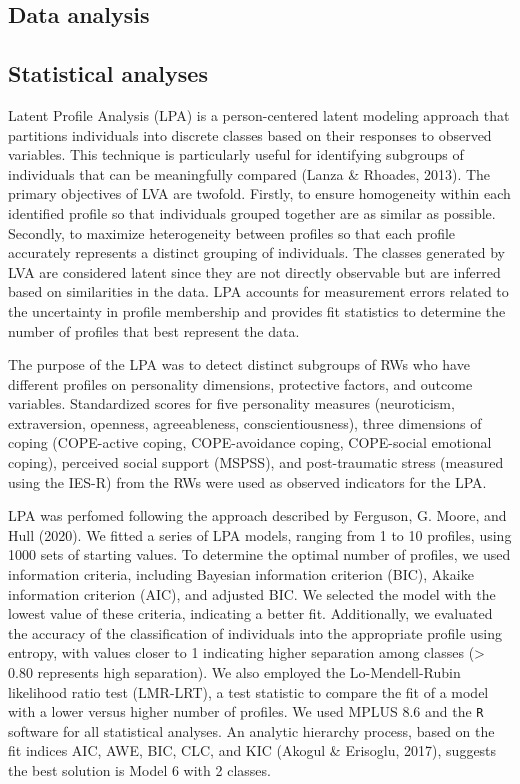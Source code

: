 \documentclass[
  man]{apa7}
\begin{document}
\hypertarget{data-analysis}{%
\subsection{Data analysis}\label{data-analysis}}

\hypertarget{statistical-analyses}{%
\subsection{Statistical analyses}\label{statistical-analyses}}

Latent Profile Analysis (LPA) is a person-centered latent modeling approach that partitions individuals into discrete classes based on their responses to observed variables. This technique is particularly useful for identifying subgroups of individuals that can be meaningfully compared (Lanza \& Rhoades, 2013). The primary objectives of LVA are twofold. Firstly, to ensure homogeneity within each identified profile so that individuals grouped together are as similar as possible. Secondly, to maximize heterogeneity between profiles so that each profile accurately represents a distinct grouping of individuals. The classes generated by LVA are considered latent since they are not directly observable but are inferred based on similarities in the data. LPA accounts for measurement errors related to the uncertainty in profile membership and provides fit statistics to determine the number of profiles that best represent the data.

The purpose of the LPA was to detect distinct subgroups of RWs who have different profiles on personality dimensions, protective factors, and outcome variables. Standardized scores for five personality measures (neuroticism, extraversion, openness, agreeableness, conscientiousness), three dimensions of coping (COPE-active coping, COPE-avoidance coping, COPE-social emotional coping), perceived social support (MSPSS), and post-traumatic stress (measured using the IES-R) from the RWs were used as observed indicators for the LPA.

LPA was perfomed following the approach described by Ferguson, G. Moore, and Hull (2020). We fitted a series of LPA models, ranging from 1 to 10 profiles, using 1000 sets of starting values. To determine the optimal number of profiles, we used information criteria, including Bayesian information criterion (BIC), Akaike information criterion (AIC), and adjusted BIC. We selected the model with the lowest value of these criteria, indicating a better fit. Additionally, we evaluated the accuracy of the classification of individuals into the appropriate profile using entropy, with values closer to 1 indicating higher separation among classes (\textgreater{} 0.80 represents high separation). We also employed the Lo-Mendell-Rubin likelihood ratio test (LMR-LRT), a test statistic to compare the fit of a model with a lower versus higher number of profiles. We used MPLUS 8.6 and the \texttt{R} software for all statistical analyses. An analytic hierarchy process, based on the fit indices AIC, AWE, BIC, CLC, and KIC (Akogul \& Erisoglu, 2017), suggests the best solution is Model 6 with 2 classes.
\end{document}
